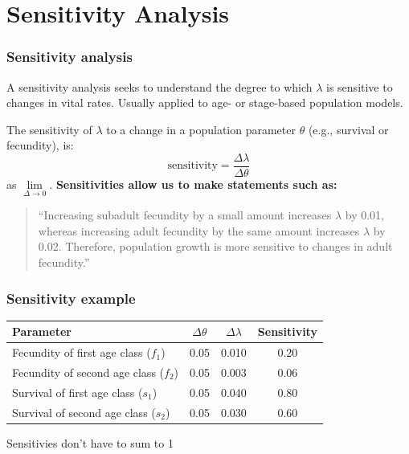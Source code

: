 \documentclass[color=usenames,dvipsnames]{beamer}\usepackage[]{graphicx}\usepackage[]{color}
\begin{document}
\section{Sensitivity Analysis}


\begin{frame}
  \frametitle{Sensitivity analysis}
  A sensitivity analysis seeks to understand the degree to which
  $\lambda$ is sensitive to changes in vital rates.
  \pause
  \vfill
  Usually applied to age- or stage-based population models. \par
  \pause
  \vfill
  The sensitivity of $\lambda$ to a change in a population parameter
  $\theta$ (e.g., survival or fecundity), is:
  \[
    \text{sensitivity} = \frac{\Delta \lambda}{\Delta \theta}
  \]
  as $\lim\limits_{\Delta \to 0}$. 
  \pause
  \vfill
  {\bf Sensitivities allow us to make statements such as:} \\
  \begin{quote}
  ``Increasing subadult fecundity by a small amount increases
  $\lambda$ by 0.01, whereas increasing adult fecundity by the same
  amount increases $\lambda$ by 0.02. Therefore, population growth is
  more sensitive to changes in adult fecundity.''
  \end{quote}
\end{frame}



\begin{frame}
  \frametitle{Sensitivity example}
  \centering
  \small
  \begin{tabular}{lccc}
    \hline
    Parameter & $\Delta \theta$ & $\Delta \lambda$ & Sensitivity \\
    \hline
    Fecundity of first age class ($f_1$)  & 0.05 & 0.010 & 0.20 \\ %
    Fecundity of second age class ($f_2$) & 0.05 & 0.003 & 0.06 \\ %
    Survival of first age class ($s_1$)   & 0.05 & 0.040 & 0.80 \\ %
    Survival of second age class ($s_2$)   & 0.05 & 0.030 & 0.60 \\
    \hline
  \end{tabular}
  \vfill
  \normalsize
  \centering Sensitivies don't have to sum to 1 \par
\end{frame}
\end{document}

